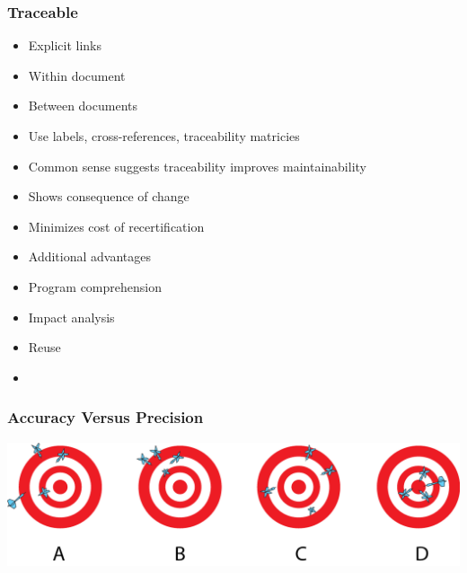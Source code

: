 \documentclass[t,12pt,numbers,fleqn]{beamer}
\begin{document}

\begin{frame}
\frametitle{Traceable}

\begin{itemize}

\item Explicit links
\bi
\item Within document
\item Between documents
\ei
\item Use labels, cross-references, traceability matricies
\item Common sense suggests traceability improves maintainability
\item Shows consequence of change
\item Minimizes cost of recertification
\item Additional advantages
\bi
\item Program comprehension
\item Impact analysis
\item Reuse
\ei
\item {} %
\end{itemize}

\end{frame}


\begin{frame}
\frametitle{Accuracy Versus Precision}

\begin{center}
 \includegraphics[width=1.0\textwidth]{../Figures/AccuracyPrecision_FromUniversityOfHawaiiAtManoa.png}
\end{center}


\end{frame}

\end{document}
